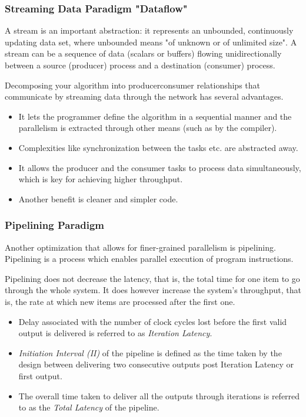 \subsubsection{Streaming Data Paradigm "Dataflow"}
A stream is an important abstraction: it represents an unbounded, continuously updating data set, where unbounded means "of unknown or of unlimited size". A stream can be a sequence of data
(scalars or buffers) flowing unidirectionally between a source (producer) process and a destination (consumer) process. 

\par Decomposing your algorithm into producerconsumer
relationships that communicate by streaming data through the network has several advantages. 

\begin{itemize}
  \item It lets the programmer define the algorithm in a sequential manner and the parallelism is extracted through other means (such as by the compiler). 
  \item Complexities like synchronization between the tasks etc. are abstracted away.
  \item It allows the producer and the consumer tasks to process data simultaneously, which is key for achieving higher throughput.
  \item Another benefit is cleaner and simpler code.
\end{itemize}


\subsubsection{Pipelining Paradigm}
Another optimization that allows for finer-grained parallelism is pipelining. Pipelining is a process which enables parallel execution of program instructions. 

\begin{highlight}
  Pipelining does not decrease the latency, that is, the total time for one item to go through the whole system. It does however increase the system's throughput, that is, the rate at which new
  items are processed after the first one.
\end{highlight}

\begin{itemize}
  \item Delay associated with the number of clock cycles lost before the first valid output is delivered is referred to as \textit{Iteration Latency}.
  \item \textit{Initiation Interval (II)} of the pipeline is defined as the time taken by the design between delivering two consecutive outputs post Iteration Latency or first output.  
  \item The overall time taken to deliver all the outputs through iterations is referred to as the \textit{Total Latency} of the pipeline.
\end{itemize}

